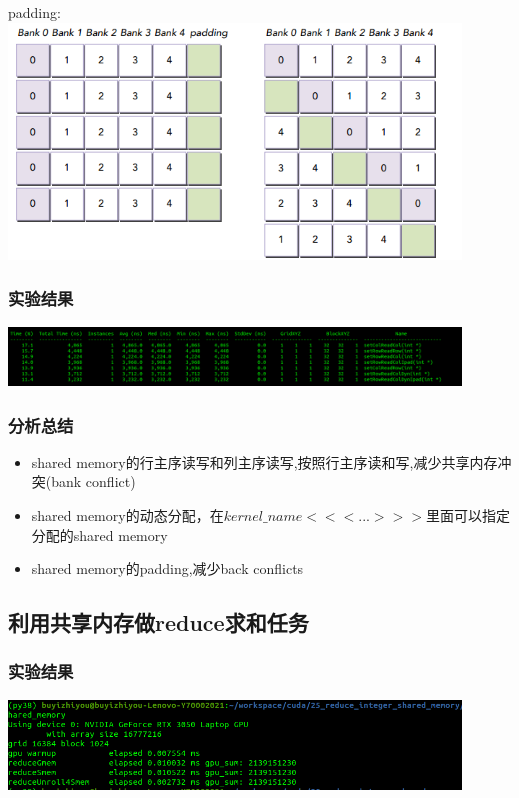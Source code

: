 padding:\\
\includegraphics[width=0.9\textwidth]{assets/padding.png}
\subsubsection{实验结果}
\noindent
\includegraphics[width=0.9\textwidth]{assets/sm.png}
\subsubsection{分析总结}
\noindent
\begin{itemize}
	\item shared memory的行主序读写和列主序读写,按照行主序读和写,减少共享内存冲突(bank conflict)
	\item shared memory的动态分配，在$kernel\_name<<<...>>>$里面可以指定分配的shared memory
	\item shared memory的padding,减少back conflicts
\end{itemize}

\subsection{利用共享内存做reduce求和任务}
\subsubsection{实验结果}
\noindent
\includegraphics[width=0.9\textwidth]{assets/smem.png}
